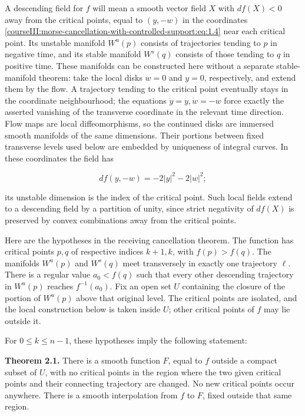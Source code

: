 A descending field for \(f\) will mean a smooth vector field \(X\) with \(df(X)<0\) away from the critical points, equal to \((y,-w)\) in the coordinates \eqref{courseIII:morse-cancellation-with-controlled-support:eq:1.4} near each critical point. Its unstable manifold \(W^u(p)\) consists of trajectories tending to \(p\) in negative time, and its stable manifold \(W^s(q)\) consists of those tending to \(q\) in positive time. These manifolds can be constructed here without a separate stable-manifold theorem: take the local disks \(w=0\) and \(y=0\), respectively, and extend them by the flow. A trajectory tending to the critical point eventually stays in the coordinate neighbourhood; the equations \(\dot y=y,\dot w=-w\) force exactly the asserted vanishing of the transverse coordinate in the relevant time direction. Flow maps are local diffeomorphisms, so the continued disks are immersed smooth manifolds of the same dimensions. Their portions between fixed transverse levels used below are embedded by uniqueness of integral curves. In these coordinates the field has

\begin{equation}
df(y,-w)=-2|y|^2-2|w|^2;
\label{courseIII:morse-cancellation-with-controlled-support:eq:2.1}
\end{equation}

its unstable dimension is the index of the critical point. Such local fields extend to a descending field by a partition of unity, since strict negativity of \(df(X)\) is preserved by convex combinations away from the critical points.

Here are the hypotheses in the receiving cancellation theorem. The function has critical points \(p,q\) of respective indices \(k+1,k\), with \(f(p)>f(q)\). The manifolds \(W^u(p)\) and \(W^s(q)\) meet transversely in exactly one trajectory \(\ell\). There is a regular value \(a_0<f(q)\) such that every other descending trajectory in \(W^u(p)\) reaches \(f^{-1}(a_0)\). Fix an open set \(U\) containing the closure of the portion of \(W^u(p)\) above that original level. The critical points are isolated, and the local construction below is taken inside \(U\); other critical points of \(f\) may lie outside it.

For \(0\leq k\leq n-1\), these hypotheses imply the following statement:

\textbf{Theorem 2.1.} There is a smooth function \(F\), equal to \(f\) outside a compact subset of \(U\), with no critical points in the region where the two given critical points and their connecting trajectory are changed. No new critical points occur anywhere. There is a smooth interpolation from \(f\) to \(F\), fixed outside that same region.

